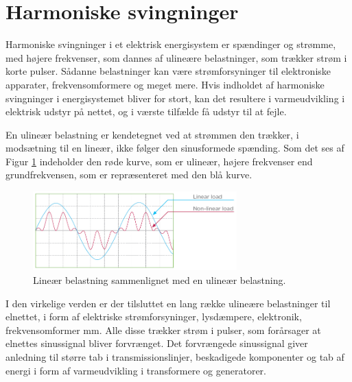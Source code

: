 
\section{Harmoniske svingninger}
\label{sec:THD}
Harmoniske svingninger i et elektrisk energisystem er spændinger og strømme, med højere frekvenser, som dannes af ulineære belastninger, som trækker strøm i korte pulser. Sådanne belastninger kan være strømforsyninger til elektroniske apparater, frekvensomformere og meget mere. Hvis indholdet af harmoniske svingninger i energisystemet bliver for stort, kan det resultere i varmeudvikling i elektrisk udstyr på nettet, og i værste tilfælde få udstyr til at fejle. \newline

En ulineær belastning er kendetegnet ved at strømmen den trækker, i modsætning til en lineær, ikke følger den sinusformede spænding.  Som det ses af Figur \ref{fig:nonLinear} indeholder den røde kurve, som er ulineær, højere frekvenser end grundfrekvensen, som er repræsenteret med den blå kurve. 


\begin{figure}[H] %
	\centering
	\includegraphics[width=0.7\textwidth]{figure/nonLinear}
	\caption{Lineær belastning sammenlignet med en ulineær belastning.}
	\label{fig:nonLinear}
\end{figure}

I den virkelige verden er der tilsluttet en lang række ulineære belastninger til elnettet, i form af elektriske strømforsyninger, lysdæmpere, elektronik, frekvensomformer mm. Alle disse trækker strøm i pulser, som forårsager at elnettes sinussignal bliver forvrænget. Det forvrængede sinussignal giver anledning til større tab i transmissionslinjer, beskadigede komponenter og tab af energi i form af varmeudvikling i transformere og generatorer. \newline

